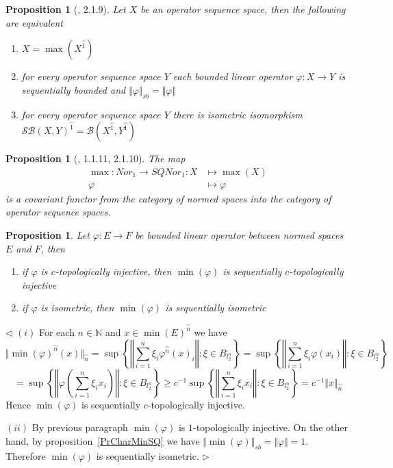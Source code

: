 \documentclass[12pt]{article}
\newtheorem{proposition}[theorem]{Proposition}
\newenvironment{proof}{\par $\triangleleft$}{$\triangleright$}
\begin{document}
\begin{proposition}[\cite{LamOpFolgen}, 2.1.9]\label{PrCharMaxSQ}
Let $X$ be an operator sequence space, then the following are equivalent
\begin{enumerate}[label = (\roman*)]
    \item $X=\max(X^{\wideparen{1}})$

    \item for every operator sequence space $Y$ 
    each bounded linear operator $\varphi:X\to Y$ 
    is sequentially bounded and $\Vert\varphi\Vert_{sb}=\Vert\varphi\Vert$

    \item for every operator sequence space 
    $Y$ there is isometric isomorphism 
    ${\mathcal{SB}(X,Y)}^{\wideparen{1}}
    =\mathcal{B}(X^{\wideparen{1}},Y^{\wideparen{1}})$
\end{enumerate}
\end{proposition}

\begin{proposition}[\cite{LamOpFolgen}, 1.1.11, 2.1.10]\label{PrMaxFucntor}
The map
$$
\begin{aligned}
\max : Nor_1 \to SQNor_1 : X&\mapsto \max(X)\\
\varphi&\mapsto\varphi
\end{aligned}
$$
is a covariant functor from the category of normed 
spaces into the category of operator sequence spaces.
\end{proposition}

\begin{proposition}\label{PrMinPreserveEmbedings} 
Let $\varphi:E\to F$ be bounded linear operator 
between normed spaces $E$ and $F$, then 
\begin{enumerate}[label = (\roman*)]
    \item if $\varphi$ is $c$-topologically injective, 
    then $\min(\varphi)$ is sequentially $c$-topologically injective

    \item if $\varphi$ is isometric, then 
    $\min(\varphi)$ is sequentially isometric
\end{enumerate}
\end{proposition}
\begin{proof} $(i)$ For each $n\in\mathbb{N}$ and 
$x\in {\min(E)}^{\wideparen{n}}$ we have
$$
\Vert {\min(\varphi)}^{\wideparen{n}}(x)\Vert_{\wideparen{n}}
=\sup\left \{\left\Vert\sum\limits_{i=1}^n\xi_i
\varphi^{\wideparen{n}}{(x)}_i\right\Vert:\xi\in B_{l_2^n}\right \}
=\sup\left \{\left\Vert\sum\limits_{i=1}^n\xi_i \varphi(x_i)\right\Vert:\xi\in
B_{l_2^n}\right \}
$$
$$
=\sup\left \{\left\Vert\varphi\left(\sum\limits_{i=1}^n\xi_i
x_i\right)\right\Vert:\xi\in B_{l_2^n}\right \} \geq
c^{-1}\sup\left \{\left\Vert\sum\limits_{i=1}^n\xi_i x_i\right\Vert:\xi\in
B_{l_2^n}\right \} =c^{-1}\Vert x\Vert_{\wideparen{n}}
$$
Hence $\min(\varphi)$ is sequentially $c$-topologically injective.

$(ii)$ By previous paragraph $\min(\varphi)$ is $1$-topologically injective. 
On the other hand, by proposition~\ref{PrCharMinSQ} we have 
$\Vert\min(\varphi)\Vert_{sb}=\Vert\varphi\Vert=1$. 
Therefore $\min(\varphi)$ is sequentially isometric.
\end{proof}
\end{document}
